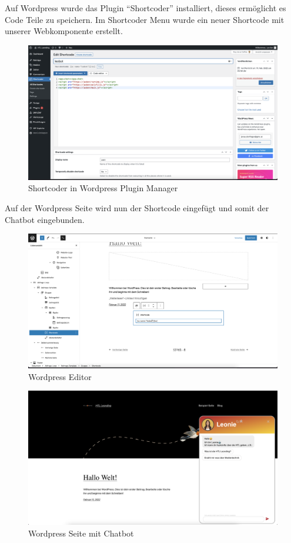 Auf Wordpress wurde das Plugin ``Shortcoder''\cite{shortcoder} installiert, dieses ermöglicht es Code Teile zu speichern.
Im Shortcoder Menu wurde ein neuer Shortcode mit unserer Webkomponente erstellt.

\begin{figure}[hbt!]
    \centering
    \includegraphics[scale=0.2]{pics/shortcoder}
    \caption{Shortcoder in Wordpress Plugin Manager}
    \label{fig:impl:shortcoder}
\end{figure}

Auf der Wordpress Seite wird nun der Shortcode eingefügt und somit der Chatbot eingebunden.

\begin{figure}[hbt!]
    \centering
    \includegraphics[scale=0.2]{pics/wordpressedit}
    \caption{Wordpress Editor}
    \label{fig:impl:wordpressedit}
\end{figure}

\begin{figure}[hbt!]
    \centering
    \includegraphics[scale=0.2]{pics/wordpresspage}
    \caption{Wordpress Seite mit Chatbot}
    \label{fig:impl:wordpresspage}
\end{figure}

